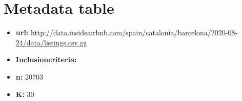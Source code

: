 

\section*{Metadata table}


\begin{multicols}{2}
\begin{itemize}
         \item \textbf{url:} \url{http://data.insideairbnb.com/spain/catalonia/barcelona/2020-08-24/data/listings.csv.gz}
         \item \textbf{Inclusioncriteria:}
\columnbreak
         \item \textbf{n:} 20703
         \item \textbf{K:} 30
\end{itemize}
\end{multicols}

